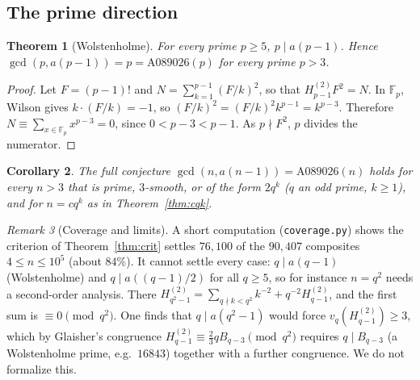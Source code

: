 \documentclass[11pt]{article}
\newtheorem{theorem}{Theorem}
\newtheorem{corollary}[theorem]{Corollary}
\theoremstyle{remark}\newtheorem{remark}[theorem]{Remark}
\newcommand{\Hh}{H^{(2)}}
\begin{document}
\subsection{The prime direction}
\begin{theorem}[Wolstenholme]\label{thm:w}
For every prime $p\ge5$, $p\mid a(p-1)$. Hence $\gcd(p,a(p-1))=p=\mathrm{A089026}(p)$ for every prime $p>3$.
\end{theorem}
\begin{proof}
Let $F=(p-1)!$ and $N=\sum_{k=1}^{p-1}(F/k)^2$, so that $\Hh_{p-1}F^2=N$. In $\mathbb{F}_p$, Wilson gives $k\cdot(F/k)=-1$, so $(F/k)^2=(F/k)^2k^{p-1}=k^{p-3}$. Therefore $N\equiv\sum_{x\in\mathbb{F}_p}x^{p-3}=0$, since $0<p-3<p-1$. As $p\nmid F^2$, $p$ divides the numerator.
\end{proof}
\begin{corollary}
The full conjecture $\gcd(n,a(n-1))=\mathrm{A089026}(n)$ holds for every $n>3$ that is prime, $3$-smooth, or of the form $2q^k$ ($q$ an odd prime, $k\ge1$), and for $n=cq^k$ as in Theorem~\ref{thm:cqk}.
\end{corollary}

\begin{remark}[Coverage and limits]\label{rem:cov}
A short computation (\texttt{coverage.py}) shows the criterion of Theorem~\ref{thm:crit} settles $76{,}100$ of the $90{,}407$ composites $4\le n\le10^5$ (about $84\%$). It cannot settle every case: $q\mid a(q-1)$ (Wolstenholme) and $q\mid a((q-1)/2)$ for all $q\ge5$, so for instance $n=q^2$ needs a second-order analysis. There $\Hh_{q^2-1}=\sum_{q\nmid k<q^2}k^{-2}+q^{-2}\Hh_{q-1}$, and the first sum is $\equiv0\pmod{q^2}$. One finds that $q\mid a(q^2-1)$ would force $v_q(\Hh_{q-1})\ge3$, which by Glaisher's congruence $\Hh_{q-1}\equiv\tfrac{2}{3}qB_{q-3}\pmod{q^2}$ requires $q\mid B_{q-3}$ (a Wolstenholme prime, e.g.\ $16843$) together with a further congruence. We do not formalize this.
\end{remark}
\end{document}
